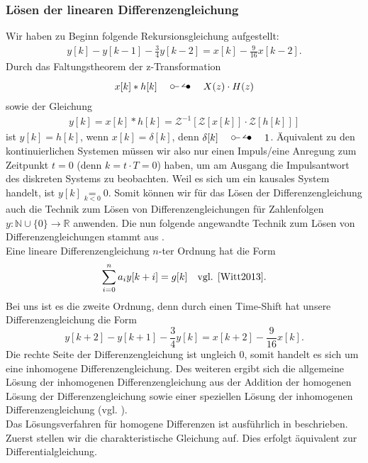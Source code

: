 \documentclass[11pt,a4paper,DIV=12]{scrartcl}
\begin{document}
\subsubsection*{Lösen der linearen Differenzengleichung}
Wir haben zu Beginn folgende Rekursionsgleichung aufgestellt:
\begin{gather}
	y[k]-y[k-1]-\frac{3}{4}y[k-2]=x[k]-\frac{9}{16}x[k-2].
\end{gather}
Durch das Faltungstheorem der z-Transformation
\begin{gather}
	x[k]\ast h[k]\quad\ztransf\quad X(z)\cdot H(z)
\end{gather}
sowie der Gleichung
\begin{gather}
	y[k]=x[k]\ast h[k]=\mathcal{Z}^{-1}\left[\mathcal{Z}\left[x[k]\right]\cdot\mathcal{Z}\left[h[k]\right]\right]
\end{gather}
ist $y[k]=h[k]$, wenn $x[k]=\delta[k]$, denn $\delta[k]\quad\ztransf\quad 1$.
Äquivalent zu den kontinuierlichen Systemen müssen wir also nur einen Impuls/eine Anregung zum Zeitpunkt $t=0$ (denn $k=t\cdot T=0$) haben, um am Ausgang die Impulsantwort des diskreten Systems zu beobachten. Weil es sich um ein kausales System handelt, ist $y[k]\underset{k<0}{=}0$. Somit können wir für das Lösen der Differenzengleichung auch die Technik zum Lösen von Differenzengleichungen für Zahlenfolgen $y:\mathbb{N}\cup\{0\}\rightarrow\mathbb{R}$ anwenden.
Die nun folgende angewandte Technik zum Lösen von Differenzengleichungen stammt aus \cite[Kap. 5]{Witt2013}.\\
Eine lineare Differenzengleichung $n$-ter Ordnung hat die Form
\begin{gather}
	\sum_{i=0}^na_iy[k+i]=g[k]\quad \text{vgl. \cite[Kap. 5 S. 80]{Witt2013}}.
\end{gather}
Bei uns ist es die zweite Ordnung, denn durch einen Time-Shift hat unsere Differenzengleichung die Form
$$y[k+2]-y[k+1]-\frac{3}{4}y[k]=x[k+2]-\frac{9}{16}x[k].$$
Die rechte Seite der Differenzengleichung ist ungleich $0$, somit handelt es sich um eine inhomogene Differenzengleichung. Des weiteren ergibt sich die allgemeine Lösung der inhomogenen Differenzengleichung aus der Addition der homogenen Lösung der Differenzengleichung sowie einer speziellen Lösung der inhomogenen Differenzengleichung (vgl. \cite[Kap. 5 S. 83]{Witt2013}).\\
Das Lösungsverfahren für homogene Differenzen ist ausführlich in \cite[Kap. 5 S. 84-85]{Witt2013} beschrieben.\\
Zuerst stellen wir die charakteristische Gleichung auf. Dies erfolgt äquivalent zur Differentialgleichung.\\
\end{document}
